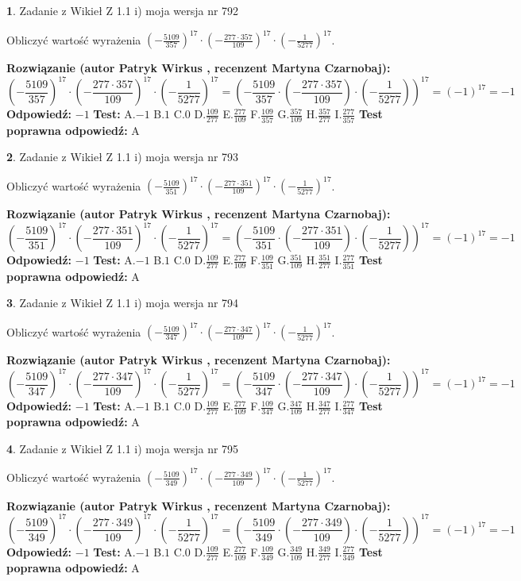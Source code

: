 \documentclass[12pt, a4paper]{article}
\theoremstyle{definition} %
\newtheorem{zad}{}
\newcommand{\zadStart}[1]{\begin{zad}#1\newline}
\newcommand{\zadStop}{\end{zad}}
\newcommand{\rozwStart}[2]{\noindent \textbf{Rozwiązanie (autor #1 , recenzent #2): }\newline}
\newcommand{\rozwStop}{\newline}
\newcommand{\odpStart}{\noindent \textbf{Odpowiedź:}\newline}
\newcommand{\odpStop}{\newline}
\newcommand{\testStart}{\noindent \textbf{Test:}\newline}
\newcommand{\testStop}{\newline}
\newcommand{\kluczStart}{\noindent \textbf{Test poprawna odpowiedź:}\newline}
\newcommand{\kluczStop}{\newline}
\begin{document}
\zadStart{Zadanie z Wikieł Z 1.1 i) moja wersja nr 792}

Obliczyć wartość wyrażenia $(-\frac{5109}{357})^{17} \cdot (-\frac{277 \cdot 357}{109})^{17} \cdot (-\frac{1}{5277})^{17}$.
\zadStop
\rozwStart{Patryk Wirkus}{Martyna Czarnobaj}
$$(-\frac{5109}{357})^{17} \cdot (-\frac{277 \cdot 357}{109})^{17} \cdot (-\frac{1}{5277})^{17} = (-\frac{5109}{357} \cdot (-\frac{277 \cdot 357}{109}) \cdot (-\frac{1}{5277}))^{17} = (-1)^{17} = -1$$
\rozwStop
\odpStart
$-1$
\odpStop
\testStart
A.$-1$ B.$1$ C.$0$ D.$\frac{109}{277}$ E.$\frac{277}{109}$
F.$\frac{109}{357}$ G.$\frac{357}{109}$
H.$\frac{357}{277}$
I.$\frac{277}{357}$
\testStop
\kluczStart
A
\kluczStop



\zadStart{Zadanie z Wikieł Z 1.1 i) moja wersja nr 793}

Obliczyć wartość wyrażenia $(-\frac{5109}{351})^{17} \cdot (-\frac{277 \cdot 351}{109})^{17} \cdot (-\frac{1}{5277})^{17}$.
\zadStop
\rozwStart{Patryk Wirkus}{Martyna Czarnobaj}
$$(-\frac{5109}{351})^{17} \cdot (-\frac{277 \cdot 351}{109})^{17} \cdot (-\frac{1}{5277})^{17} = (-\frac{5109}{351} \cdot (-\frac{277 \cdot 351}{109}) \cdot (-\frac{1}{5277}))^{17} = (-1)^{17} = -1$$
\rozwStop
\odpStart
$-1$
\odpStop
\testStart
A.$-1$ B.$1$ C.$0$ D.$\frac{109}{277}$ E.$\frac{277}{109}$
F.$\frac{109}{351}$ G.$\frac{351}{109}$
H.$\frac{351}{277}$
I.$\frac{277}{351}$
\testStop
\kluczStart
A
\kluczStop



\zadStart{Zadanie z Wikieł Z 1.1 i) moja wersja nr 794}

Obliczyć wartość wyrażenia $(-\frac{5109}{347})^{17} \cdot (-\frac{277 \cdot 347}{109})^{17} \cdot (-\frac{1}{5277})^{17}$.
\zadStop
\rozwStart{Patryk Wirkus}{Martyna Czarnobaj}
$$(-\frac{5109}{347})^{17} \cdot (-\frac{277 \cdot 347}{109})^{17} \cdot (-\frac{1}{5277})^{17} = (-\frac{5109}{347} \cdot (-\frac{277 \cdot 347}{109}) \cdot (-\frac{1}{5277}))^{17} = (-1)^{17} = -1$$
\rozwStop
\odpStart
$-1$
\odpStop
\testStart
A.$-1$ B.$1$ C.$0$ D.$\frac{109}{277}$ E.$\frac{277}{109}$
F.$\frac{109}{347}$ G.$\frac{347}{109}$
H.$\frac{347}{277}$
I.$\frac{277}{347}$
\testStop
\kluczStart
A
\kluczStop



\zadStart{Zadanie z Wikieł Z 1.1 i) moja wersja nr 795}

Obliczyć wartość wyrażenia $(-\frac{5109}{349})^{17} \cdot (-\frac{277 \cdot 349}{109})^{17} \cdot (-\frac{1}{5277})^{17}$.
\zadStop
\rozwStart{Patryk Wirkus}{Martyna Czarnobaj}
$$(-\frac{5109}{349})^{17} \cdot (-\frac{277 \cdot 349}{109})^{17} \cdot (-\frac{1}{5277})^{17} = (-\frac{5109}{349} \cdot (-\frac{277 \cdot 349}{109}) \cdot (-\frac{1}{5277}))^{17} = (-1)^{17} = -1$$
\rozwStop
\odpStart
$-1$
\odpStop
\testStart
A.$-1$ B.$1$ C.$0$ D.$\frac{109}{277}$ E.$\frac{277}{109}$
F.$\frac{109}{349}$ G.$\frac{349}{109}$
H.$\frac{349}{277}$
I.$\frac{277}{349}$
\testStop
\kluczStart
A
\kluczStop
\end{document}
